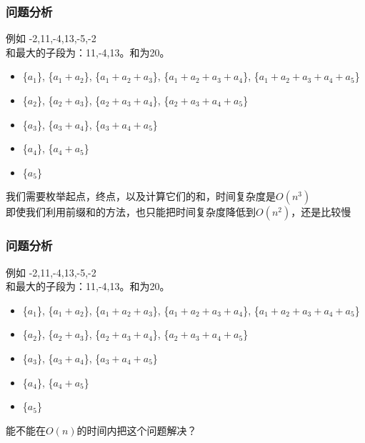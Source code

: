 \documentclass{beamer}
\begin{document}
\begin{frame}[fragile]
\frametitle{问题分析}
\begin{block}{例如}
	-2,11,-4,13,-5,-2\\
	和最大的子段为：11,-4,13。和为20。 
\end{block}
\begin{itemize} \scriptsize
	\item \{$a_1$\}, \{$a_1+a_2$\}, \{$a_1+a_2+a_3$\}, \{$a_1+a_2+a_3+a_4$\}, \{$a_1+a_2+a_3+a_4+a_5$\} 
	\item \{$ a_2$\}, \{$ a_2+a_3$\}, \{$a_2+a_3+a_4$\}, \{$a_2+a_3+a_4+a_5$\} 
	\item \{$ a_3$\}, \{$ a_3+a_4$\}, \{$ a_3+a_4+a_5$\} 
	\item \{$a_4$\}, \{$a_4+a_5$\}
	\item \{$a_5$\} 
\end{itemize}
我们需要枚举起点，终点，以及计算它们的和，时间复杂度是$O(n^3)$\\
即使我们利用前缀和的方法，也只能把时间复杂度降低到$O(n^2)$，还是比较慢
\end{frame}
	
\begin{frame}[fragile]
\frametitle{问题分析}
\begin{block}{例如}
	-2,11,-4,13,-5,-2\\
	和最大的子段为：11,-4,13。和为20。 
\end{block}
\begin{itemize} \scriptsize
	\item \{$a_1$\}, \{$a_1+a_2$\}, \{$a_1+a_2+a_3$\}, \{$a_1+a_2+a_3+a_4$\}, \{$a_1+a_2+a_3+a_4+a_5$\} 
	\item \{$ a_2$\}, \{$ a_2+a_3$\}, \{$a_2+a_3+a_4$\}, \{$a_2+a_3+a_4+a_5$\} 
	\item \{$ a_3$\}, \{$ a_3+a_4$\}, \{$ a_3+a_4+a_5$\} 
	\item \{$a_4$\}, \{$a_4+a_5$\}
	\item \{$a_5$\} 
\end{itemize}
能不能在$O(n)$的时间内把这个问题解决？\\

\end{frame}
\end{document}
